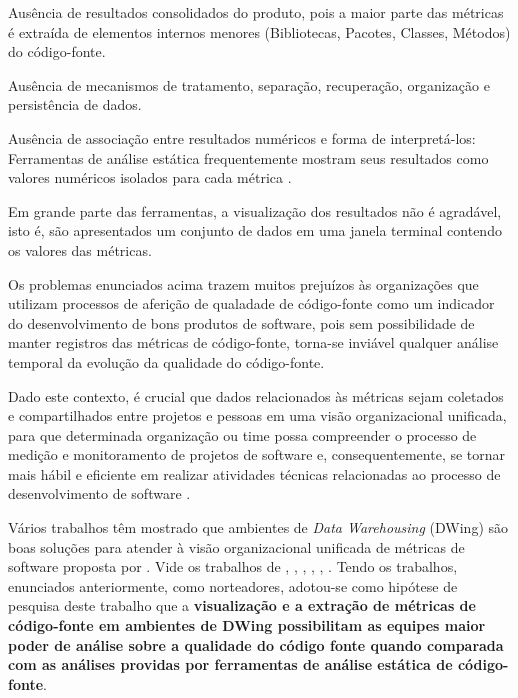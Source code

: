 
\begin{problems}
    \item Ausência de resultados consolidados do produto, pois a maior 
	parte das métricas é extraída de elementos internos menores (Bibliotecas, 
	Pacotes, Classes, Métodos) do código-fonte.
    
	\item Ausência de mecanismos de tratamento, separação, recuperação, 
	organização e persistência de dados. 
	
	\item Ausência de associação entre resultados numéricos e forma de 
	interpretá-los: Ferramentas de análise estática frequentemente mostram 
	seus resultados como valores numéricos isolados para cada métrica 
	\cite{Meirelles2013}. 
	
	\item Em grande parte das ferramentas, a visualização dos resultados não é 
	agradável, isto é, são apresentados um conjunto de dados em uma janela 
	terminal contendo os valores das métricas.
	
    \end{problems}
	
Os problemas enunciados acima trazem muitos prejuízos às organizações que 
utilizam processos de aferição de qualadade de código-fonte como um indicador do desenvolvimento de bons produtos de software, pois sem possibilidade de manter registros das métricas de código-fonte, torna-se inviável qualquer análise temporal da evolução da qualidade do código-fonte. 

Dado este contexto, é crucial que dados relacionados às métricas sejam 
coletados e compartilhados entre projetos e pessoas em uma visão organizacional unificada, para que determinada organização ou time possa compreender o processo de medição e monitoramento de projetos de software e, 
consequentemente, se tornar mais hábil e eficiente em realizar atividades 
técnicas relacionadas ao processo de desenvolvimento de software 
\cite{Chulani2003}. 



Vários trabalhos têm mostrado que ambientes de \textit{Data Warehousing} 
(DWing) são boas soluções para atender à visão organizacional unificada de 
métricas de software proposta por . Vide os trabalhos 
de , , ,
, , . 
Tendo os trabalhos, enunciados anteriormente, como norteadores, adotou-se como 
hipótese de pesquisa deste trabalho que a \textbf{visualização e a extração 
de métricas de código-fonte em ambientes de DWing possibilitam as equipes maior poder de análise sobre a qualidade do código fonte quando comparada com as análises providas por ferramentas de análise estática de código-fonte}. 


